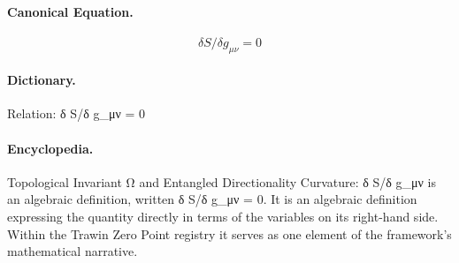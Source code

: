 \paragraph{Canonical Equation.}
\[
\delta S/\delta g_{\mu\nu} = 0
\]

\paragraph{Dictionary.}
Relation: δ S/δ g\_μν = 0

\paragraph{Encyclopedia.}
Topological Invariant Ω and Entangled Directionality Curvature: δ S/δ g\_μν is an algebraic definition, written δ S/δ g\_μν = 0. It is an algebraic definition expressing the quantity directly in terms of the variables on its right-hand side. Within the Trawin Zero Point registry it serves as one element of the framework's mathematical narrative.
